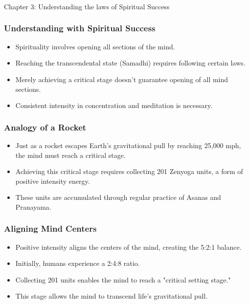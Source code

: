 \begin{frame}[fragile]\frametitle{}
\begin{center}
{\Large Chapter 3: Understanding the laws of Spiritual Success }
\end{center}
\end{frame}


\begin{frame}[fragile]\frametitle{Understanding with Spiritual Success}
    \begin{itemize}
        \item Spirituality involves opening all sections of the mind.
        \item Reaching the transcendental state (Samadhi) requires following certain laws.
        \item Merely achieving a critical stage doesn't guarantee opening of all mind sections.
        \item Consistent intensity in concentration and meditation is necessary.
    \end{itemize}
\end{frame}

\begin{frame}[fragile]\frametitle{Analogy of a Rocket}
    \begin{itemize}
        \item Just as a rocket escapes Earth’s gravitational pull by reaching 25,000 mph, the mind must reach a critical stage.
        \item Achieving this critical stage requires collecting 201 Zenyoga units, a form of positive intensity energy.
        \item These units are accumulated through regular practice of Asanas and Pranayama.
    \end{itemize}
\end{frame}

\begin{frame}[fragile]\frametitle{Aligning Mind Centers}
    \begin{itemize}
        \item Positive intensity aligns the centers of the mind, creating the 5:2:1 balance.
        \item Initially, humans experience a 2:4:8 ratio.
        \item Collecting 201 units enables the mind to reach a "critical setting stage."
        \item This stage allows the mind to transcend life’s gravitational pull.
    \end{itemize}
\end{frame}


